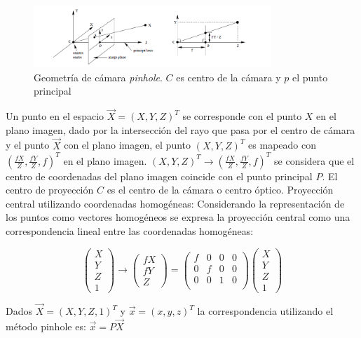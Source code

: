 \begin{figure}[H]
  \centering
    \includegraphics[width=0.8\textwidth]{./Cap6_reconstruccion/pinhole.png}
  \caption{Geometría de cámara \emph{pinhole}. $C$ es centro de la cámara y $p$ el punto principal}
  \label{fig:Calib-Pinhole}
\end{figure}

Un punto en el espacio $ \vec{X}=(X,Y,Z)^T$ se corresponde con el punto $X$ en el plano imagen, dado por la intersección del rayo que pasa por el centro de cámara y el punto $\vec{X}$ con el plano imagen, el punto $(X,Y,Z)^T$ es mapeado con $(\frac{fX}{Z}, \frac{fY}{Z}, f)^T$ en el plano imagen.
$(X, Y, Z)^T \to (\frac{fX}{Z}, \frac{fY}{Z},f)^T$ se considera que el centro de coordenadas del plano imagen coincide con el punto principal $P$.
El centro de proyección $C$ es el centro de la cámara o centro óptico.
Proyección central utilizando coordenadas homogéneas:
Considerando la representación de los puntos como vectores homogéneos se expresa la proyección central como una correspondencia lineal entre las coordenadas homogéneas:

\[
\begin{pmatrix}
X \\ Y \\ Z \\ 1
\end{pmatrix}
\to
\begin{pmatrix}
fX \\ fY \\ Z
\end{pmatrix}
=
\begin{pmatrix}
f & 0 & 0 & 0 \\
0 & f & 0 & 0 \\
0 & 0 & 1 & 0 \\
\end{pmatrix}
\begin{pmatrix}
X \\ Y \\ Z \\ 1
\end{pmatrix}
\]

Dados $\vec{X} = (X,Y,Z,1)^T$ y $\vec{x} =(x,y,z)^T$ la correspondencia utilizando el método pinhole es:
$\vec{x}=P\vec{X}$

